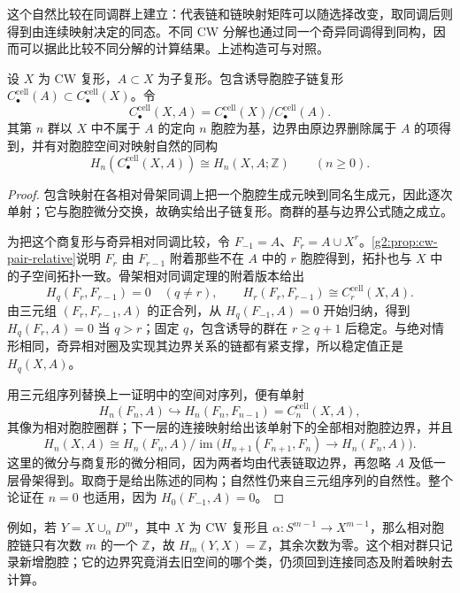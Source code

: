 这个自然比较在同调群上建立：代表链和链映射矩阵可以随选择改变，取同调后则得到由连续映射决定的同态。不同 CW 分解也通过同一个奇异同调得到同构，因而可以据此比较不同分解的计算结果。上述构造可与\cite[第2.2节，Cellular Homology]{Hatcher2002}对照。

\begin{theorem}\label{g2:thm:relative-cellular-comparison}
	设 \(X\) 为 CW 复形，\(A\subset X\) 为子复形。包含诱导胞腔子链复形 \(C_\bullet^{\mathrm{cell}}(A)\subset C_\bullet^{\mathrm{cell}}(X)\)。令
	\[
		C_\bullet^{\mathrm{cell}}(X,A)=C_\bullet^{\mathrm{cell}}(X)/C_\bullet^{\mathrm{cell}}(A).
	\]
	其第 \(n\) 群以 \(X\) 中不属于 \(A\) 的定向 \(n\) 胞腔为基，边界由原边界删除属于 \(A\) 的项得到，并有对胞腔空间对映射自然的同构
	\[
		H_n(C_\bullet^{\mathrm{cell}}(X,A))\cong H_n(X,A;\mathbb Z)\qquad(n\ge0).
	\]
\end{theorem}
\begin{proof}
	包含映射在各相对骨架同调上把一个胞腔生成元映到同名生成元，因此逐次单射；它与胞腔微分交换，故确实给出子链复形。商群的基与边界公式随之成立。

	为把这个商复形与奇异相对同调比较，令 \(F_{-1}=A\)、\(F_r=A\cup X^r\)。\cref{g2:prop:cw-pair-relative}说明 \(F_r\) 由 \(F_{r-1}\) 附着那些不在 \(A\) 中的 \(r\) 胞腔得到，拓扑也与 \(X\) 中的子空间拓扑一致。骨架相对同调定理的附着版本给出
	\[
		H_q(F_r,F_{r-1})=0\quad(q\ne r),\qquad
		H_r(F_r,F_{r-1})\cong C_r^{\mathrm{cell}}(X,A).
	\]
	由三元组 \((F_r,F_{r-1},A)\) 的正合列，从 \(H_q(F_{-1},A)=0\) 开始归纳，得到 \(H_q(F_r,A)=0\) 当 \(q>r\)；固定 \(q\)，包含诱导的群在 \(r\ge q+1\) 后稳定。与绝对情形相同，奇异相对圈及实现其边界关系的链都有紧支撑，所以稳定值正是 \(H_q(X,A)\)。

	用三元组序列替换上一证明中的空间对序列，便有单射
	\[
		H_n(F_n,A)\hookrightarrow H_n(F_n,F_{n-1})=C_n^{\mathrm{cell}}(X,A),
	\]
	其像为相对胞腔圈群；下一层的连接映射给出该单射下的全部相对胞腔边界，并且
	\[
		H_n(X,A)\cong H_n(F_n,A)/\operatorname{im}\bigl(H_{n+1}(F_{n+1},F_n)\to H_n(F_n,A)\bigr).
	\]
	这里的微分与商复形的微分相同，因为两者均由代表链取边界，再忽略 \(A\) 及低一层骨架得到。取商于是给出陈述的同构；自然性仍来自三元组序列的自然性。整个论证在 \(n=0\) 也适用，因为 \(H_0(F_{-1},A)=0\)。
\end{proof}

例如，若 \(Y=X\cup_\alpha D^m\)，其中 \(X\) 为 CW 复形且 \(\alpha:S^{m-1}\to X^{m-1}\)，那么相对胞腔链只有次数 \(m\) 的一个 \(\mathbb Z\)，故 \(H_m(Y,X)=\mathbb Z\)，其余次数为零。这个相对群只记录新增胞腔；它的边界究竟消去旧空间的哪个类，仍须回到连接同态及附着映射去计算。
